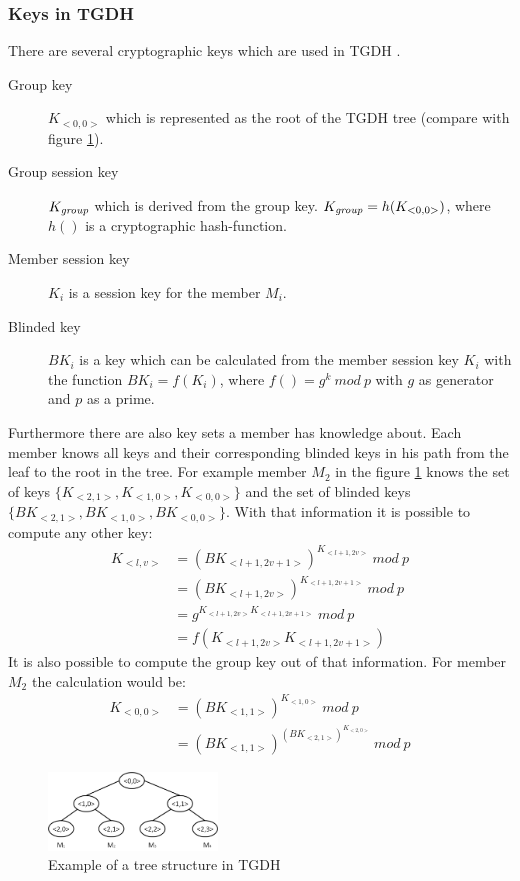 \subsubsection{Keys in TGDH}
There are several cryptographic keys which are used in TGDH \cite{Liao2004}.
\begin{description}
\item[Group key] $K_{<0,0>}$ which is represented as the root of the TGDH tree (compare with figure \ref{fig:tgdh_tree}).
\item[Group session key] $K_{\text{\textit{group}}}$ which is derived from the group key. $K_{\text{\textit{group}}} = h(K_{<0,0>})$, where $h()$ is a cryptographic hash-function.
\item[Member session key] $K_i$ is a session key for the member $M_i$. 
\item[Blinded key] $BK_i$ is a key which can be calculated from the member session key $K_i$ with the function $BK_i = f(K_i)$, where $f() = g^k~mod~p$ with $g$ as generator and $p$ as a prime.
\end{description}
Furthermore there are also key sets a member has knowledge about. Each member knows all keys and their corresponding blinded keys in his path from the leaf to the root in the tree. For example member $M_2$ in the figure \ref{fig:tgdh_tree} knows the set of keys $\{K_{<2,1>}, K_{<1,0>}, K_{<0,0>}\}$ and the set of blinded keys $\{BK_{<2,1>}, BK_{<1,0>}, BK_{<0,0>}\}$. With that information it is possible to compute any other key:
\begin{align*}
K_{<l,v>} &= (BK_{<l+1, 2v+1>})^{K_{<l+1, 2v>}}~mod~p\\
&= (BK_{<l+1, 2v>})^{K_{<l+1, 2v+1>}}~mod~p\\
&= g^{K_{<l+1, 2v>}K_{<l+1, 2v+1>}}~mod~p\\
&= f(K_{<l+1, 2v>}K_{<l+1, 2v+1>})
\end{align*}
It is also possible to compute the group key out of that information. For member $M_2$ the calculation would be:
\begin{align*}
K_{<0,0>} &= (BK_{<1,1>})^{K_{<1,0>}}~mod~p\\
&= (BK_{<1,1>})^{(BK_{<2,1>})^{K_{<2,0>}}}~mod~p
\end{align*}
\begin{figure}[!h]
\centering\includegraphics[width=0.4\textwidth]{Images/tgdh_tree}
\caption{Example of a tree structure in TGDH}
\label{fig:tgdh_tree}
\end{figure}

